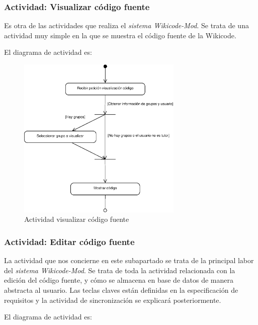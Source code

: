 \newpage
\subsubsection{Actividad: Visualizar código fuente}

Es otra de las actividades que realiza el \emph{sistema Wikicode-Mod}. Se trata de una actividad muy simple en la que se muestra el código fuente de la Wikicode.

El diagrama de actividad es:

\begin{figure}[h]
	\centering
	\includegraphics[width=0.7\textwidth]{./img/DiagramaA2.eps}
	\caption{Actividad visualizar código fuente}
\end{figure}

\subsubsection{Actividad: Editar código fuente}

La actividad que nos concierne en este subapartado se trata de la principal labor del \emph{sistema Wikicode-Mod}. Se trata de toda la actividad relacionada con la edición del código fuente, y cómo se almacena en base de datos de manera abstracta al usuario. Las teclas claves están definidas en la especificación de requisitos y la actividad de sincronización se explicará posteriormente.

\newpage

El diagrama de actividad es:

